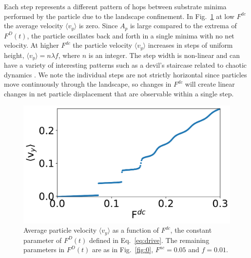 \documentclass[twocolumn,preprintnumbers,amsmath,amssymb,aps,prx]{revtex4}
\begin{document}
Each step represents a different pattern of hops
between substrate minima
performed by the particle
due to the landscape confinement.  
In Fig.~\ref{fig:1} at %
low $F^{dc}$ the average velocity $\langle v_y \rangle$ is zero.
Since 
$A_p$ is large compared to the extrema of $F^{D}(t)$,
the particle oscillates back and forth
in a single minima with no net velocity.
At higher $F^{dc}$ the particle velocity 
$\langle v_{y} \rangle$ increases in steps of uniform height,
$\langle v_{y} \rangle = n \lambda f$,
where $n$ is an integer.
The step width is non-linear 
and can have a variety of
interesting patterns
such as a devil's staircase related to chaotic dynamics \cite{Bak1986}.
We note the individual steps
are not strictly horizontal 
since particles move continuously
through the landscape, so changes in $F^{dc}$
will create linear changes in 
net particle displacement that are observable
within a single step.
\begin{center}
\begin{figure}[h!]
\centering
\includegraphics[width=\columnwidth]{sweep_FDC_vs_vx.pdf}
\caption{Average particle velocity  $\langle v_{y} \rangle$ as a function of $F^{dc}$,
  the constant parameter of $F^D(t)$ defined in Eq.~\ref{eq:drive}.
  The remaining parameters in $F^D(t)$ are as in Fig.~\ref{fig:0}, $F^{ac}=0.05$ and $f = 0.01$.  }
\label{fig:1}
\end{figure}
\end{center}
\end{document}
